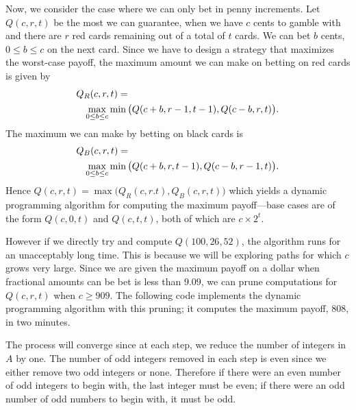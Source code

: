 Now, we consider the case where we can only bet in penny increments.
Let $Q(c,r,t)$ be the most we can guarantee, when we have $c$ cents to
gamble with and there are $r$ red cards remaining out of a total of $t$ cards.
We can bet $b$ cents, $0 \leq b \leq c$ on the next card.
Since we have to design a strategy that maximizes the worst-case
payoff, the maximum amount we can make on betting on red cards is given by
 {
\begin{eqnarray*}
\lefteqn{Q_R(c,r,t)  = } \\
& & \max_{0 \leq b \leq c } \min\big( Q(c+b, r-1, t-1), Q(c-b,r,t)\big).
\end{eqnarray*}
}
The maximum we can make by betting on black cards is
{
\begin{eqnarray*}
\lefteqn{Q_B(c,r,t) =} \\
& & \max_{0 \leq b \leq c} \min\big( Q(c+b, r, t-1), Q(c-b,r-1,t)\big).
\end{eqnarray*}
}
Hence $Q(c,r,t) = \max\big(Q_R(c,r.t), Q_B(c,r,t)\big)$ which yields a dynamic programming
algorithm for computing the maximum payoff---base cases are of the form $Q(c,0,t)$
and $Q(c,t,t)$, both of which are $c\times 2^t$.

However if we directly try and compute $Q(100,26,52)$, the algorithm runs for an
unacceptably long time. This is because we will be exploring paths for which $c$ grows
very large. Since we are given the maximum payoff on a dollar
when fractional amounts can be bet is less than $9.09$, we can prune computations for $Q(c,r,t)$
when $c \geq 909$. The following code implements the dynamic programming algorithm
with this pruning; it computes the maximum payoff, $808$, in two minutes.



The process will converge since at each step, we reduce the number of integers in $A$ by one.
The number of odd integers removed in 
each step is even since we either remove two odd integers or none.  
Therefore if there were an even number of odd integers to begin with,
the last integer must be even; if there were an odd number of odd numbers to begin with, it must be odd.

